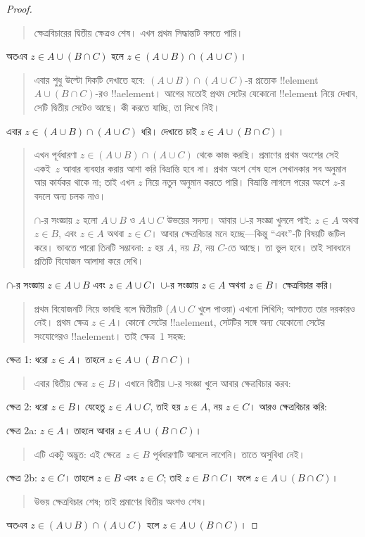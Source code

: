 \documentclass[../../../include/open-logic-section]{subfiles}
\begin{document}
\begin{proof}
\begin{quote}
ক্ষেত্রবিচারের দ্বিতীয় ক্ষেত্রও শেষ। এখন প্রথম
সিদ্ধান্তটি বলতে পারি।
\end{quote}
অতএব $z \in A \cup (B \cap C)$ হলে
$z \in (A \cup B) \cap (A \cup C)$।
\begin{quote}
এবার শুধু উল্টো দিকটি দেখাতে হবে: $(A \cup B)
\cap (A \cup C)$-র প্রত্যেক !!{element}
$A \cup (B \cap C)$-রও !!a{element}। আগের
মতোই প্রথম সেটের যেকোনো !!{element} নিয়ে
দেখাব, সেটি দ্বিতীয় সেটেও আছে। কী করতে
যাচ্ছি, তা লিখে নিই।
\end{quote}
এবার $z \in (A \cup B) \cap (A \cup C)$ ধরি।
দেখাতে চাই $z \in A \cup (B \cap C)$।
\begin{quote}
এখন পূর্বধারণা $z \in (A \cup B) \cap (A
\cup C)$ থেকে কাজ করছি। প্রমাণের প্রথম অংশের
সেই একই~$z$ আবার ব্যবহার করায় আশা করি
বিভ্রান্তি হবে না। প্রথম অংশ শেষ হলে সেখানকার
সব অনুমান আর কার্যকর থাকে না; তাই এখন $z$
নিয়ে নতুন অনুমান করতে পারি। বিভ্রান্তি লাগলে
পরের অংশে $z$-র বদলে অন্য চলক নাও।

$\cap$-র সংজ্ঞায় $z$ হলো $A \cup B$ ও
$A \cup C$ উভয়ের সদস্য। আবার $\cup$-র
সংজ্ঞা খুললে পাই: $z \in A$ অথবা $z \in B$,
এবং $z \in A$ অথবা $z \in C$। আবার ক্ষেত্রবিচার
মনে হচ্ছে—কিন্তু ``এবং''-টি বিষয়টি জটিল করে।
ভাবতে পারো তিনটি সম্ভাবনা: $z$ হয় $A$, নয় $B$,
নয় $C$-তে আছে। তা ভুল হবে। তাই সাবধানে প্রতিটি
বিযোজন আলাদা করে দেখি।
\end{quote}
$\cap$-র সংজ্ঞায় $z \in A \cup B$ এবং
$z \in A \cup C$। $\cup$-র সংজ্ঞায়
$z \in A$ অথবা $z \in B$। ক্ষেত্রবিচার করি।
\begin{quote}
প্রথম বিযোজনটি নিয়ে ভাবছি বলে দ্বিতীয়টি
($A \cup C$ খুলে পাওয়া) এখনো লিখিনি; আপাতত
তার দরকারও নেই। প্রথম ক্ষেত্র $z \in A$।
কোনো সেটের !!a{element}, সেটটির সঙ্গে অন্য
যেকোনো সেটের সংযোগেরও !!a{element}। তাই
ক্ষেত্র~1 সহজ:
\end{quote}
ক্ষেত্র 1: ধরো $z \in A$। তাহলে
$z \in A \cup (B \cap C)$।
\begin{quote}
এবার দ্বিতীয় ক্ষেত্র $z \in B$। এখানে দ্বিতীয়
$\cup$-র সংজ্ঞা খুলে আবার ক্ষেত্রবিচার করব:
\end{quote}
ক্ষেত্র 2: ধরো $z \in B$। যেহেতু
$z \in A \cup C$, তাই হয় $z \in A$,
নয় $z \in C$। আরও ক্ষেত্রবিচার করি:

ক্ষেত্র 2a: $z \in A$। তাহলে আবার
$z \in A \cup (B \cap C)$।
\begin{quote}
এটি একটু অদ্ভুত: এই ক্ষেত্রে~$z \in B$
পূর্বধারণাটি আসলে লাগেনি। তাতে অসুবিধা নেই।
\end{quote}
ক্ষেত্র 2b: $z \in C$। তাহলে $z \in B$
এবং $z \in C$; তাই $z \in B \cap C$।
ফলে $z \in A \cup (B \cap C)$।
\begin{quote}
উভয় ক্ষেত্রবিচার শেষ; তাই প্রমাণের দ্বিতীয়
অংশও শেষ।
\end{quote}
অতএব $z \in (A \cup B) \cap (A \cup C)$ হলে
$z \in A \cup (B \cap C)$।
\end{proof}
\end{document}
